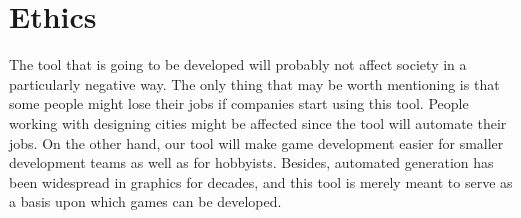 \section{Ethics}
\begin{comment}
\textcolor{red}{
I planeringsrapporten förväntas gruppen skriva en kortare text där gruppen bedömer om samhälleliga och etiska aspekter behöver beaktas och analyseras vidare i uppsatsen/rapporten. Gruppen använder sig med fördel av bilaga 7 som stöd samt de digitala resurser som finns på Studentportalens sidor om kandidatarbetet.
}
\end{comment}

The tool that is going to be developed will probably not affect society in a particularly negative way. The only thing that may be worth mentioning is that some people might lose their jobs if companies start using this tool. People working with designing cities might be affected since the tool will automate their jobs. On the other hand, our tool will make game development easier for smaller development teams as well as for hobbyists. Besides, automated generation has been widespread in graphics for decades, and this tool is merely meant to serve as a basis upon which games can be developed.

